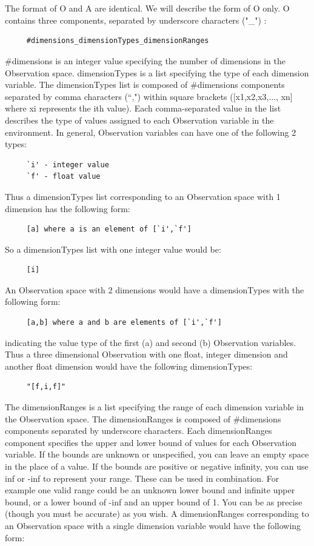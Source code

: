 \documentclass[11pt]{article}
\begin{document}
\\\\
The format of O and A are identical. We will describe the form of O only. O contains three components, separated by underscore characters ("\_") :
\begin{verbatim}        
     #dimensions_dimensionTypes_dimensionRanges
\end{verbatim}
\#dimensions is an integer value specifying the number of dimensions in the Observation space. dimensionTypes is a list specifying the type of each dimension variable. The dimensionTypes list is composed of \#dimensions components separated by comma characters (``,") within square brackets ([x1,x2,x3,..., xn] where xi  represents the ith value). Each comma-separated value in the list describes the type of values assigned to each Observation variable in the environment. In general, Observation variables can have one of the following 2 types:
\begin{verbatim}
     `i' - integer value
     `f' - float value
\end{verbatim}
Thus a dimensionTypes list corresponding to an Observation space with 1 dimension has the following form:
\begin{verbatim}
     [a] where a is an element of [`i',`f']
\end{verbatim}
So a dimensionTypes list with one integer value would be:    
\begin{verbatim}    
     [i]
\end{verbatim}     
An Observation space with 2 dimensions would have a dimensionTypes with the following form:
\begin{verbatim}
     [a,b] where a and b are elements of [`i',`f']
\end{verbatim}
indicating the value type of the first (a) and second (b) Observation variables. Thus a three dimensional Observation with one float, integer dimension and another float dimension would have the following dimensionTypes:
\begin{verbatim}
     "[f,i,f]"
\end{verbatim}
The dimensionRanges is a list specifying the range of each dimension variable in the Observation space.  The dimensionRanges is composed of \#dimensions components separated by underscore characters. Each dimensionRanges component specifies the upper and lower bound of values for each Observation variable. If the bounds are unknown or unspecified, you can leave an empty space in the place of a value. If the bounds are positive or negative infinity, you can use inf or -inf to represent your range. These can be used in combination. For example one valid range could be an unknown lower bound and infinite upper bound, or a lower bound of -inf and an upper bound of 1. You can be as precise (though you must be accurate) as you wish. A dimensionRanges corresponding to an Observation space with a single dimension variable would have the following form:
\end{document}
